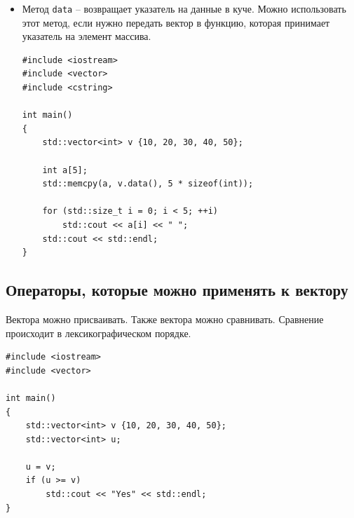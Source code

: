 \documentclass{article}
\begin{document}
\begin{itemize}
\item Метод \texttt{data} -- возвращает указатель на данные в куче. Можно использовать этот метод, если нужно передать вектор в функцию, которая принимает указатель на элемент массива.
\begin{lstlisting}
#include <iostream>
#include <vector>
#include <cstring>

int main()
{
    std::vector<int> v {10, 20, 30, 40, 50};
    
    int a[5];
    std::memcpy(a, v.data(), 5 * sizeof(int));
    
    for (std::size_t i = 0; i < 5; ++i)
        std::cout << a[i] << " ";
    std::cout << std::endl;
}
\end{lstlisting}
\end{itemize}

\subsection*{Операторы, которые можно применять к вектору}
Вектора можно присваивать. Также вектора можно сравнивать. Сравнение происходит в лексикографическом порядке.
\begin{lstlisting}
#include <iostream>
#include <vector>

int main()
{
    std::vector<int> v {10, 20, 30, 40, 50};
    std::vector<int> u;
    
    u = v;
    if (u >= v)
        std::cout << "Yes" << std::endl;
}
\end{lstlisting}
\end{document}
